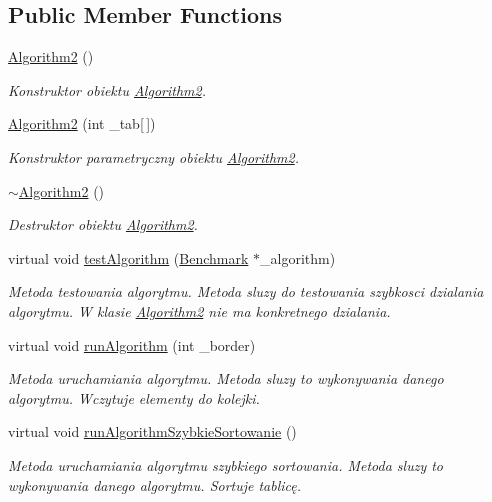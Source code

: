 \subsection*{Public Member Functions}
\begin{DoxyCompactItemize}
\item 
\hyperlink{class_algorithm2_ad77a51433815456eca8139444e78b49b}{Algorithm2} ()
\begin{DoxyCompactList}\small\item\em Konstruktor obiektu \hyperlink{class_algorithm2}{Algorithm2}. \end{DoxyCompactList}\item 
\hyperlink{class_algorithm2_ac5cc064a2727d2c1a2b32d335cd73f8d}{Algorithm2} (int \+\_\+tab\mbox{[}$\,$\mbox{]})
\begin{DoxyCompactList}\small\item\em Konstruktor parametryczny obiektu \hyperlink{class_algorithm2}{Algorithm2}. \end{DoxyCompactList}\item 
\hyperlink{class_algorithm2_ab2c630f56f5d2e90f62a13fdaf0cd954}{$\sim$\+Algorithm2} ()
\begin{DoxyCompactList}\small\item\em Destruktor obiektu \hyperlink{class_algorithm2}{Algorithm2}. \end{DoxyCompactList}\item 
virtual void \hyperlink{class_algorithm2_a6eb066d5e51f2187e717454751bc2934}{test\+Algorithm} (\hyperlink{class_benchmark}{Benchmark} $\ast$\+\_\+algorithm)
\begin{DoxyCompactList}\small\item\em Metoda testowania algorytmu. Metoda sluzy do testowania szybkosci dzialania algorytmu. W klasie \hyperlink{class_algorithm2}{Algorithm2} nie ma konkretnego dzialania. \end{DoxyCompactList}\item 
virtual void \hyperlink{class_algorithm2_a409e58d5fb0b6d2407cc986cf163703b}{run\+Algorithm} (int \+\_\+border)
\begin{DoxyCompactList}\small\item\em Metoda uruchamiania algorytmu. Metoda sluzy to wykonywania danego algorytmu. Wczytuje elementy do kolejki. \end{DoxyCompactList}\item 
virtual void \hyperlink{class_algorithm2_a103c600d6f7a33872672e4b26d89475f}{run\+Algorithm\+Szybkie\+Sortowanie} ()
\begin{DoxyCompactList}\small\item\em Metoda uruchamiania algorytmu szybkiego sortowania. Metoda sluzy to wykonywania danego algorytmu. Sortuje tablicę. \end{DoxyCompactList}\end{DoxyCompactItemize}

